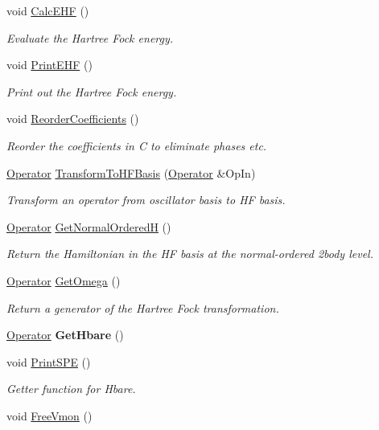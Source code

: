 \begin{DoxyCompactItemize}
void \hyperlink{classHartreeFock_aef506c5c5bc0f317ceb9c71bdc44d62b}{Calc\+E\+HF} ()
\begin{DoxyCompactList}\small\item\em Evaluate the Hartree Fock energy. \end{DoxyCompactList}\item 
void \hyperlink{classHartreeFock_a2c3bdda2ea86f9a3b18d203c9aecc353}{Print\+E\+HF} ()
\begin{DoxyCompactList}\small\item\em Print out the Hartree Fock energy. \end{DoxyCompactList}\item 
void \hyperlink{classHartreeFock_a2eb6754f57250a03a2e1bd3e2aef4daf}{Reorder\+Coefficients} ()
\begin{DoxyCompactList}\small\item\em Reorder the coefficients in C to eliminate phases etc. \end{DoxyCompactList}\item 
\hyperlink{classOperator}{Operator} \hyperlink{classHartreeFock_a55914915cea16669e549025c244b62d0}{Transform\+To\+H\+F\+Basis} (\hyperlink{classOperator}{Operator} \&Op\+In)
\begin{DoxyCompactList}\small\item\em Transform an operator from oscillator basis to HF basis. \end{DoxyCompactList}\item 
\hyperlink{classOperator}{Operator} \hyperlink{classHartreeFock_a17bdb52033e2f62bba72ea86bc196b37}{Get\+Normal\+OrderedH} ()
\begin{DoxyCompactList}\small\item\em Return the Hamiltonian in the HF basis at the normal-\/ordered 2body level. \end{DoxyCompactList}\item 
\hyperlink{classOperator}{Operator} \hyperlink{classHartreeFock_a53011b381945ed5c61f50b209db5bf64}{Get\+Omega} ()
\begin{DoxyCompactList}\small\item\em Return a generator of the Hartree Fock transformation. \end{DoxyCompactList}\item 
\hyperlink{classOperator}{Operator} {\bfseries Get\+Hbare} ()\hypertarget{classHartreeFock_a7f2a07edc3ccaa0cf9bbc0faadfd9ddf}{}\label{classHartreeFock_a7f2a07edc3ccaa0cf9bbc0faadfd9ddf}

\item 
void \hyperlink{classHartreeFock_ab96b85eca26bf7c57430242201066932}{Print\+S\+PE} ()
\begin{DoxyCompactList}\small\item\em Getter function for Hbare. \end{DoxyCompactList}\item 
void \hyperlink{classHartreeFock_aef3c1b45c5418ead19f258774a301f83}{Free\+Vmon} ()\hypertarget{classHartreeFock_aef3c1b45c5418ead19f258774a301f83}{}\label{classHartreeFock_aef3c1b45c5418ead19f258774a301f83}


\end{DoxyCompactItemize}
